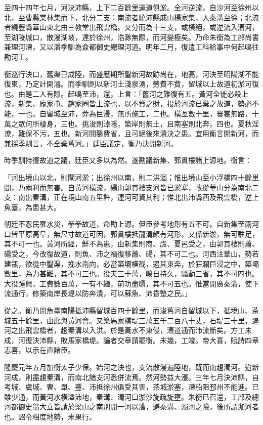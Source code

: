 至四十四年七月，河決沛縣，上下二百餘里運道俱淤。全河逆流，自沙河至徐州以北，至曹縣棠林集而下，北分二支：南流者繞沛縣戚山楊家集，入秦溝至徐；北流者繞豐縣華山東北由三教堂出飛雲橋。又分而為十三支，或橫絕，或逆流入漕河，至湖陵城口，散漫湖坡，達於徐州，浩渺無際，而河變極矣。乃命朱衡為工部尚書兼理河漕，又以潘季馴為僉都御史總理河道。明年二月，復遣工科給事中何起鳴往勘河工。

衡巡行決口，舊渠已成陸，而盛應期所鑿新河故跡尚在，地高，河決至昭陽湖不能復東，乃定計開濬。而季馴則以新河土淺泉湧，勞費不貲，留城以上故道初淤可復也。由是二人有隙。起鳴至沛，還，上言：「舊河之難復有五。黃河全徙必殺上流，新集、龐家屯、趙家圈皆上流也，以不貲之財，投於河流已棄之故道，勢必不能，一也。自留城至沛，莽為巨浸，無所施工，二也。橫亙數十里，褰裳無路，十萬之眾何所棲身，三也。挑浚則淖隱，築岸則無土，且南塞則北奔，四也。夏秋淫潦，難保不污，五也。新河開鑿費省，且可絕後來潰決之患。宜用衡言開新河，而兼採季馴言，不全棄舊河。」廷臣議定，衡乃決開新河。

時季馴持復故道之議，廷臣又多以為然。遂勘議新集、郭貫樓諸上源地。衡言：

「河出境山以北，則閘河淤；出徐州以南，則二洪涸；惟出境山至小浮橋四十餘里間，乃兩利而無害。自黃河橫流，碭山郭貫樓支河皆已淤塞，改從華山分為南北二支：南出秦溝，正在境山南五里許，運河可資其利；惟北出沛縣西及飛雲橋，逆上魚臺，為患甚大。

朝廷不忍民罹水災，拳拳故道，命勘上源。但臣參考地形有五不可。自新集至兩河口皆平原高阜，無尺寸故道可因，郭貫樓抵龍溝頗有河形，又係新淤，無可駐足，其不可一也。黃河所經，鮮不為患，由新集則商、虞、夏邑受之，由郭貫樓則蕭、碭受之，今改復故道，則魚、沛之禍復移蕭、碭，其不可二也。河西注華山，勢若建瓴，欲從中鑿渠，挽水南向，必當築壩橫截，遏其東奔，於狂瀾巨浸之中，築壩數里，為力甚難，其不可三也。役夫三十萬，曠日持久，騷動三省，其不可四也。大役踵興，工費數百萬，一有不繼，前功盡隳，其不可五也。惟當開廣秦溝，使下流通行，修築南岸長堤以防奔潰，可以蘇魚、沛昏墊之民。」

從之。衡乃開魚臺南陽抵沛縣留城百四十餘里，而浚舊河自留城以下，抵境山、茶城五十餘里，由此與黃河會。又築馬家橋堤三萬五千二百八十丈，石堤三十里，遏河之出飛雲橋者，趨秦溝以入洪。於是黃水不東侵，漕道通而沛流斷矣。方工未成，河復決沛縣，敗馬家橋堤。論者交章請罷衡。未幾，工竣。帝大喜，賦詩四章志喜，以示在直諸臣。

隆慶元年五月加衡太子少保。始河之決也，支流散漫遍陸地，既而南趨濁河。迨新河成，則盡趨秦溝，而南北諸支河悉併流焉。然河勢益大漲。三年七月決沛縣，自考城、虞城、曹、單、豐、沛抵徐州俱受其害，茶城淤塞，漕船阻邳州不能進。已雖少通，而黃河水橫溢沛地，秦溝、濁河口淤沙旋疏旋壅。朱衡已召還，工部及總河都御史翁大立皆請於梁山之南別開一河以漕，避秦溝、濁河之險，後所謂泇河者也。詔令相度地勢，未果行。

